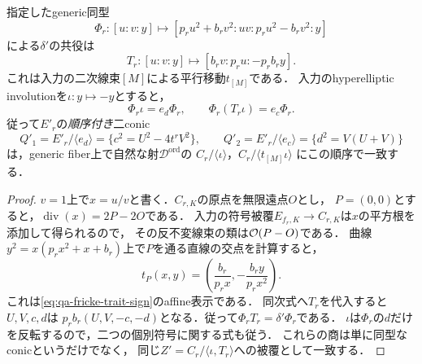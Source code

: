 \begin{proposition}[二捩れ平行移動と順序付きconic]
\label{prop:qa-fricke-trait-sign-conjugacy}
指定したgeneric同型
\[
 \Phi_r:[u:v:y]\longmapsto
 [p_ru^2+b_rv^2:uv:p_ru^2-b_rv^2:y]
\]
による$\delta'$の共役は
\[
 T_r:[u:v:y]\longmapsto[b_rv:p_ru:-p_rb_ry].
 \tag{F-sign}\label{eq:qa-fricke-trait-sign}
\]
これは入力の二次線束$[M]$による平行移動$t_{[M]}$である．
入力のhyperelliptic involutionを$\iota:y\mapsto-y$とすると，
\[
 \Phi_r\iota=e_d\Phi_r,\qquad
 \Phi_r(T_r\iota)=e_c\Phi_r.
\]
従って$E'_r$の\emph{順序付き}二conic
\[
 Q'_1=E'_r/\langle e_d\rangle=\{c^2=U^2-4t^rV^2\},\qquad
 Q'_2=E'_r/\langle e_c\rangle=\{d^2=V(U+V)\}
\]
は，generic fiber上で自然な射$\mathscr D^{\mathrm{ord}}$の
$C_r/\langle\iota\rangle$，$C_r/\langle t_{[M]}\iota\rangle$
にこの順序で一致する．
\end{proposition}
\begin{proof}
$v=1$上で$x=u/v$と書く．$C_{r,K}$の原点を無限遠点$O$とし，
$P=(0,0)$とすると，$\operatorname{div}(x)=2P-2O$である．
入力の符号被覆$E_{f_r,K}\to C_{r,K}$は$x$の平方根を添加して得られるので，
その反不変線束の類は$\mathcal O(P-O)$である．
曲線$y^2=x(p_rx^2+x+b_r)$上で$P$を通る直線の交点を計算すると，
\[
 t_P(x,y)=\left(\frac{b_r}{p_rx},
                   -\frac{b_ry}{p_rx^2}\right).
\]
これは\eqref{eq:qa-fricke-trait-sign}のaffine表示である．
同次式へ$T_r$を代入すると$U,V,c,d$は
$p_rb_r(U,V,-c,-d)$となる．従って$\Phi_rT_r=\delta'\Phi_r$である．
$\iota$は$\Phi_r$の$d$だけを反転するので，二つの個別符号に関する式も従う．
これらの商は単に同型なconicというだけでなく，
同じ$Z'=C_r/\langle\iota,T_r\rangle$への被覆として一致する．
\end{proof}

